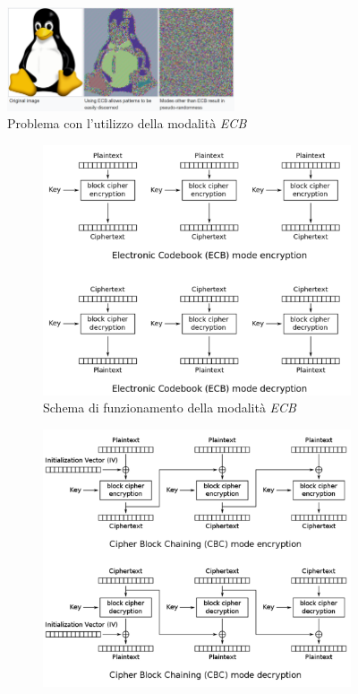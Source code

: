 \begin{figure}[h]
    \centering
    \includegraphics[width=0.6\textwidth]{capitoli/figure-crittografia/aes-ecb-linux.png}
    \caption{Problema con l'utilizzo della modalità \emph{ECB}}
    \label{fig:aes-ecb-linux}
\end{figure}


\begin{figure}[h!b]
    \begin{subfigure}{0.48\textwidth}
        \includegraphics[width=1\textwidth]{capitoli/figure-crittografia/aes-ecb.png}
        \caption{Schema di funzionamento della modalità \emph{ECB}}
        \label{fig:aes-ecb}
    \end{subfigure}
    \begin{subfigure}{0.48\textwidth}
        \includegraphics[width=1\textwidth]{capitoli/figure-crittografia/aes-cbc.png}

\end{subfigure}
\end{figure}
